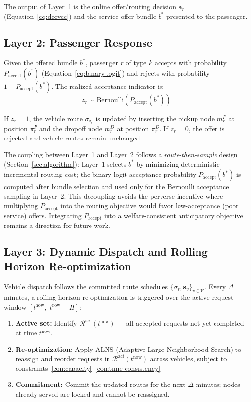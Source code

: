 The output of Layer~1 is the online offer/routing decision $\mathbf{a}_r$ (Equation~\ref{eq:decvec})
and the service offer bundle $b^*$ presented to the passenger.

\subsection{Layer 2: Passenger Response}

Given the offered bundle $b^*$, passenger $r$ of type $k$ accepts with probability
$P_{\text{accept}}(b^*)$ (Equation~\ref{eq:binary-logit}) and rejects with probability
$1 - P_{\text{accept}}(b^*)$. The realized acceptance indicator is:
\begin{equation}
  z_r \sim \text{Bernoulli}\!\left(P_{\text{accept}}(b^*)\right)
\end{equation}

If $z_r = 1$, the vehicle route $\sigma_{v_r}$ is updated by inserting the pickup node
$m_r^P$ at position $\pi_r^P$ and the dropoff node $m_r^D$ at position $\pi_r^D$.
If $z_r = 0$, the offer is rejected and vehicle routes remain unchanged.

The coupling between Layer~1 and Layer~2 follows a \emph{route-then-sample} design
(Section~\ref{sec:algorithm}): Layer~1 selects $b^*$ by minimizing deterministic
incremental routing cost; the binary logit acceptance probability
$P_{\text{accept}}(b^*)$ is computed after bundle selection and used only for
the Bernoulli acceptance sampling in Layer~2. This decoupling avoids the perverse
incentive where multiplying $P_{\text{accept}}$ into the routing objective would
favor low-acceptance (poor service) offers. Integrating $P_{\text{accept}}$ into a
welfare-consistent anticipatory objective remains a direction for future work.

\subsection{Layer 3: Dynamic Dispatch and Rolling Horizon Re-optimization}

Vehicle dispatch follows the committed route schedules
$\{\sigma_v, \mathbf{s}_v\}_{v \in \mathcal{V}}$.
Every $\Delta$ minutes, a rolling horizon re-optimization is triggered over the active
request window $[t^{\text{now}},\; t^{\text{now}} + H]$:

\begin{enumerate}
  \item \textbf{Active set:} Identify $\mathcal{R}^{\text{act}}(t^{\text{now}})$ --- all
        accepted requests not yet completed at time $t^{\text{now}}$.
  \item \textbf{Re-optimization:} Apply ALNS (Adaptive Large Neighborhood Search) to
        reassign and reorder requests in $\mathcal{R}^{\text{act}}(t^{\text{now}})$ across
        vehicles, subject to constraints~\ref{con:capacity}--\ref{con:time-consistency}.
  \item \textbf{Commitment:} Commit the updated routes for the next $\Delta$ minutes;
        nodes already served are locked and cannot be reassigned.
\end{enumerate}

